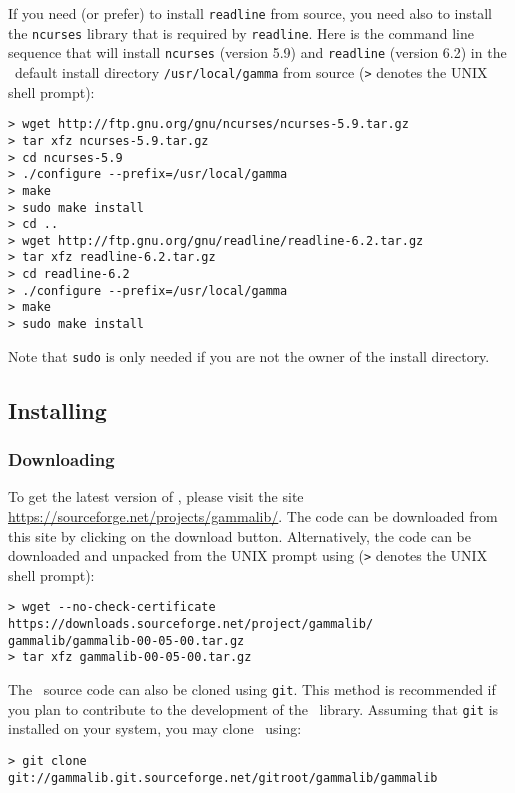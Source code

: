 \documentclass{article}[12pt,a4]
\begin{document}
If you need (or prefer) to install {\tt readline} from source, you need also to install the
{\tt ncurses} library that is required by {\tt readline}.
Here is the command line sequence that will install 
{\tt ncurses} (version 5.9) and 
{\tt readline} (version 6.2)
in the \this\ default install directory {\tt /usr/local/gamma} from source
({\tt >} denotes the UNIX shell prompt):
\begin{verbatim}
> wget http://ftp.gnu.org/gnu/ncurses/ncurses-5.9.tar.gz
> tar xfz ncurses-5.9.tar.gz
> cd ncurses-5.9
> ./configure --prefix=/usr/local/gamma
> make
> sudo make install
> cd ..
> wget http://ftp.gnu.org/gnu/readline/readline-6.2.tar.gz
> tar xfz readline-6.2.tar.gz
> cd readline-6.2
> ./configure --prefix=/usr/local/gamma
> make
> sudo make install
\end{verbatim}
Note that {\tt sudo} is only needed if you are not the owner of the install directory.


\subsection{Installing \this}

\subsubsection{Downloading \this}

To get the latest version of \this, please visit the site \url{https://sourceforge.net/projects/gammalib/}.
The code can be downloaded from this site by clicking on the download
button.
Alternatively, the code can be downloaded and unpacked from the UNIX prompt using
 ({\tt >} denotes the UNIX shell prompt):
\begin{verbatim}
> wget --no-check-certificate https://downloads.sourceforge.net/project/gammalib/
gammalib/gammalib-00-05-00.tar.gz
> tar xfz gammalib-00-05-00.tar.gz
\end{verbatim}

The \this\ source code can also be cloned using {\tt git}.
This method is recommended if you plan to contribute to the development of the \this\ library.
Assuming that {\tt git} is installed on your system, you may clone \this\ using:
\begin{verbatim}
> git clone git://gammalib.git.sourceforge.net/gitroot/gammalib/gammalib
\end{verbatim}
\end{document}
